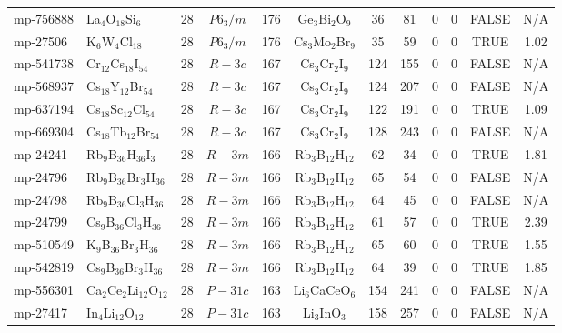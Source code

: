 {\begin{longtable}{llcccccccccc}
    mp-756888 & La$_{4}$O$_{18}$Si$_{6}$ & 28    & $P6_3/m$ & 176   & Ge$_{3}$Bi$_{2}$O$_{9}$ & 36    & 81    & 0     & 0     & FALSE & N/A \\
    mp-27506 & K$_{6}$W$_{4}$Cl$_{18}$ & 28    & $P6_3/m$ & 176   & Cs$_{3}$Mo$_{2}$Br$_{9}$ & 35    & 59    & 0     & 0     & TRUE  & 1.02  \\
    mp-541738 & Cr$_{12}$Cs$_{18}$I$_{54}$ & 28    & $R-3c$ & 167   & Cs$_{3}$Cr$_{2}$I$_{9}$ & 124   & 155   & 0     & 0     & FALSE & N/A \\
    mp-568937 & Cs$_{18}$Y$_{12}$Br$_{54}$ & 28    & $R-3c$ & 167   & Cs$_{3}$Cr$_{2}$I$_{9}$ & 124   & 207   & 0     & 0     & FALSE & N/A \\
    mp-637194 & Cs$_{18}$Sc$_{12}$Cl$_{54}$ & 28    & $R-3c$ & 167   & Cs$_{3}$Cr$_{2}$I$_{9}$ & 122   & 191   & 0     & 0     & TRUE  & 1.09  \\
    mp-669304 & Cs$_{18}$Tb$_{12}$Br$_{54}$ & 28    & $R-3c$ & 167   & Cs$_{3}$Cr$_{2}$I$_{9}$ & 128   & 243   & 0     & 0     & FALSE & N/A \\
    mp-24241 & Rb$_{9}$B$_{36}$H$_{36}$I$_{3}$ & 28    & $R-3m$ & 166   & Rb$_{3}$B$_{12}$H$_{12}$ & 62    & 34    & 0     & 0     & TRUE  & 1.81  \\
    mp-24796 & Rb$_{9}$B$_{36}$Br$_{3}$H$_{36}$ & 28    & $R-3m$ & 166   & Rb$_{3}$B$_{12}$H$_{12}$ & 65    & 54    & 0     & 0     & FALSE & N/A \\
    mp-24798 & Rb$_{9}$B$_{36}$Cl$_{3}$H$_{36}$ & 28    & $R-3m$ & 166   & Rb$_{3}$B$_{12}$H$_{12}$ & 64    & 45    & 0     & 0     & FALSE & N/A \\
    mp-24799 & Cs$_{9}$B$_{36}$Cl$_{3}$H$_{36}$ & 28    & $R-3m$ & 166   & Rb$_{3}$B$_{12}$H$_{12}$ & 61    & 57    & 0     & 0     & TRUE  & 2.39  \\
    mp-510549 & K$_{9}$B$_{36}$Br$_{3}$H$_{36}$ & 28    & $R-3m$ & 166   & Rb$_{3}$B$_{12}$H$_{12}$ & 65    & 60    & 0     & 0     & TRUE  & 1.55  \\
    mp-542819 & Cs$_{9}$B$_{36}$Br$_{3}$H$_{36}$ & 28    & $R-3m$ & 166   & Rb$_{3}$B$_{12}$H$_{12}$ & 64    & 39    & 0     & 0     & TRUE  & 1.85  \\
    mp-556301 & Ca$_{2}$Ce$_{2}$Li$_{12}$O$_{12}$ & 28    & $P-31c$ & 163   & Li$_{6}$CaCeO$_{6}$ & 154   & 241   & 0     & 0     & FALSE & N/A \\
    mp-27417 & In$_{4}$Li$_{12}$O$_{12}$ & 28    & $P-31c$ & 163   & Li$_{3}$InO$_{3}$ & 158   & 257   & 0     & 0     & FALSE & N/A \\

\end{longtable}}
